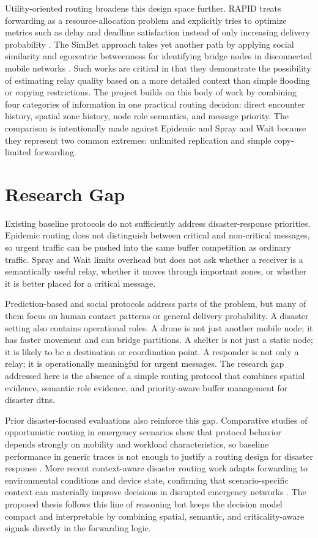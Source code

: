 Utility-oriented routing broadens this design space further. RAPID treats forwarding as a resource-allocation problem and explicitly tries to optimize metrics such as delay and deadline satisfaction instead of only increasing delivery probability \citep{balasubramanian2007rapid}. The SimBet approach takes yet another path by applying social similarity and egocentric betweenness for identifying bridge nodes in disconnected mobile networks \citep{daly2007simbet}. Such works are critical in that they demonstrate the possibility of estimating relay quality based on a more detailed context than simple flooding or copying restrictions.
The project builds on this body of work by combining four categories of information in one practical routing decision: direct encounter history, spatial zone history, node role semantics, and message priority. The comparison is intentionally made against Epidemic and Spray and Wait because they represent two common extremes: unlimited replication and simple copy-limited forwarding.

\section{Research Gap}
Existing baseline protocols do not sufficiently address disaster-response priorities. Epidemic routing does not distinguish between critical and non-critical messages, so urgent traffic can be pushed into the same buffer competition as ordinary traffic. Spray and Wait limits overhead but does not ask whether a receiver is a semantically useful relay, whether it moves through important zones, or whether it is better placed for a critical message.

Prediction-based and social protocols address parts of the problem, but many of them focus on human contact patterns or general delivery probability. A disaster setting also contains operational roles. A drone is not just another mobile node; it has faster movement and can bridge partitions. A shelter is not just a static node; it is likely to be a destination or coordination point. A responder is not only a relay; it is operationally meaningful for urgent messages. The research gap addressed here is the absence of a simple routing protocol that combines spatial evidence, semantic role evidence, and priority-aware buffer management for disaster \acp{dtn}.

Prior disaster-focused evaluations also reinforce this gap. Comparative studies of opportunistic routing in emergency scenarios show that protocol behavior depends strongly on mobility and workload characteristics, so baseline performance in generic traces is not enough to justify a routing design for disaster response \citep{martincampillo2013disaster}. More recent context-aware disaster routing work adapts forwarding to environmental conditions and device state, confirming that scenario-specific context can materially improve decisions in disrupted emergency networks \citep{rosasolivos2020csar}. The proposed thesis follows this line of reasoning but keeps the decision model compact and interpretable by combining spatial, semantic, and criticality-aware signals directly in the forwarding logic.

